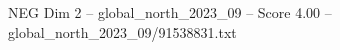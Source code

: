 \begin{textsample}{NEG Dim 2 – global\_north\_2023\_09 – Score 4.00 – global\_north\_2023\_09/91538831.txt}
\end{textsample}

